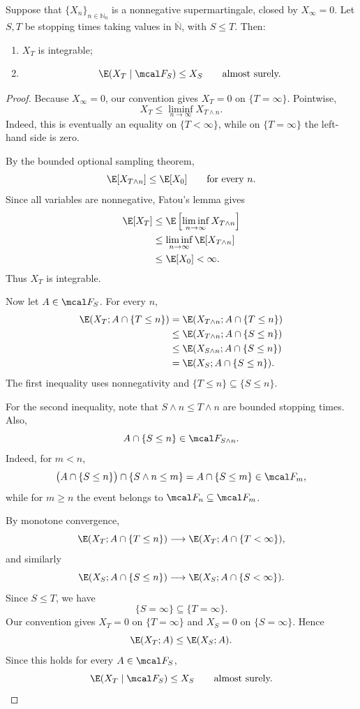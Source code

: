 \begin{proposition}
Suppose that $\{X_n\}_{n\in\mathbb N_0}$ is a nonnegative
supermartingale, closed by $X_\infty=0$. Let $S,T$ be stopping times
taking values in $\overline{\mathbb N}$, with $S\leq T$. Then:

\begin{enumerate}
    \item[(i)] $X_T$ is integrable;

    \item[(ii)]
    \[
        \E(X_T\mid\mcal F_S)\leq X_S
        \qquad\text{almost surely.}
    \]
\end{enumerate}
\end{proposition}

\begin{proof}
Because $X_\infty=0$, our convention gives $X_T=0$ on
$\{T=\infty\}$. Pointwise,
\[
    X_T\leq \liminf_{n\to\infty}X_{T\wedge n}.
\]
Indeed, this is eventually an equality on $\{T<\infty\}$, while on
$\{T=\infty\}$ the left-hand side is zero.

By the bounded optional sampling theorem,
\[
    \E[X_{T\wedge n}]
    \leq \E[X_0]
    \qquad\text{for every }n.
\]
Since all variables are nonnegative, Fatou's lemma gives
\begin{align*}
    \E[X_T]
    &\leq
    \E\left[\liminf_{n\to\infty}X_{T\wedge n}\right] \\
    &\leq
    \liminf_{n\to\infty}\E[X_{T\wedge n}] \\
    &\leq \E[X_0]<\infty.
\end{align*}
Thus $X_T$ is integrable.

Now let $A\in\mcal F_S$. For every $n$,
\begin{align*}
    \E(X_T;A\cap\{T\leq n\})
    &=
    \E(X_{T\wedge n};A\cap\{T\leq n\}) \\
    &\leq
    \E(X_{T\wedge n};A\cap\{S\leq n\}) \\
    &\leq
    \E(X_{S\wedge n};A\cap\{S\leq n\}) \\
    &=
    \E(X_S;A\cap\{S\leq n\}).
\end{align*}
The first inequality uses nonnegativity and
$\{T\leq n\}\subseteq\{S\leq n\}$.

For the second inequality, note that $S\wedge n\leq T\wedge n$ are
bounded stopping times. Also,
\[
    A\cap\{S\leq n\}\in\mcal F_{S\wedge n}.
\]
Indeed, for $m<n$,
\[
    \bigl(A\cap\{S\leq n\}\bigr)
    \cap\{S\wedge n\leq m\}
    =
    A\cap\{S\leq m\}\in\mcal F_m,
\]
while for $m\geq n$ the event belongs to $\mcal F_n\subseteq\mcal F_m$.

By monotone convergence,
\[
    \E(X_T;A\cap\{T\leq n\})
    \longrightarrow
    \E(X_T;A\cap\{T<\infty\}),
\]
and similarly
\[
    \E(X_S;A\cap\{S\leq n\})
    \longrightarrow
    \E(X_S;A\cap\{S<\infty\}).
\]
Since $S\leq T$, we have
\[
    \{S=\infty\}\subseteq\{T=\infty\}.
\]
Our convention gives $X_T=0$ on $\{T=\infty\}$ and $X_S=0$ on
$\{S=\infty\}$. Hence
\[
    \E(X_T;A)\leq \E(X_S;A).
\]
Since this holds for every $A\in\mcal F_S$,
\[
    \E(X_T\mid\mcal F_S)\leq X_S
    \qquad\text{almost surely.}
\]
\end{proof}


